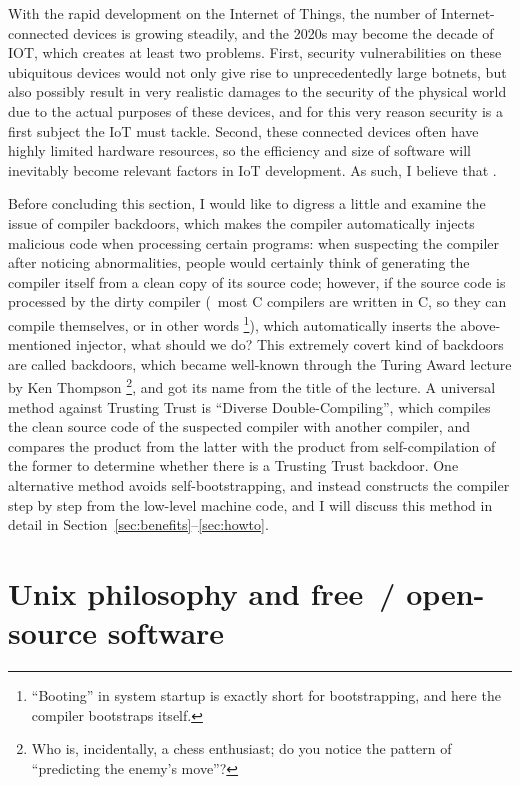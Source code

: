 With the rapid development on the Internet of Things, the number of
Internet-connected devices is growing steadily, and the 2020s may become
the decade of IOT, which creates at least two problems.  First, security
vulnerabilities on these ubiquitous devices would not only give rise to
unprecedentedly large botnets, but also possibly result in very realistic
damages to the security of the physical world due to the actual purposes of
these devices, and for this very reason security is a first subject the IoT must
tackle.  Second, these connected devices often have highly limited hardware
resources, so the efficiency and size of software will inevitably become
relevant factors in IoT development.  As such, I believe that .

Before concluding this section, I would like to digress a little and examine
the issue of compiler backdoors, which makes the compiler automatically injects
malicious code when processing certain programs: when suspecting the compiler
after noticing abnormalities, people would certainly think of generating the
compiler itself from a clean copy of its source code; however, if the source
code is processed by the dirty compiler (\eg~most C compilers are written in C,
so they can compile themselves, or in other words %
\footnote{``Booting'' in system startup is exactly short for bootstrapping,
and here the compiler bootstraps itself.}), which automatically inserts the
above-mentioned injector, what should we do?  This extremely covert kind of
backdoors are called  backdoors, which became well-known
through the Turing Award lecture by Ken Thompson%
\footnote{Who is, incidentally, a chess enthusiast; do you notice the
pattern of ``predicting the enemy's move''?}, and got its name from the
title of the lecture.  A universal method against Trusting Trust is ``Diverse
Double-Compiling'', which compiles the clean source code
of the suspected compiler with another compiler, and compares the product from
the latter with the product from self-compilation of the former to determine
whether there is a Trusting Trust backdoor.  One alternative method avoids
self-bootstrapping, and instead constructs the compiler step by step from
the low-level machine code, and I will discuss
this method in detail in Section~\ref{sec:benefits}--\ref{sec:howto}.

\section{Unix philosophy and free~/ open-source software}\label{sec:foss}

